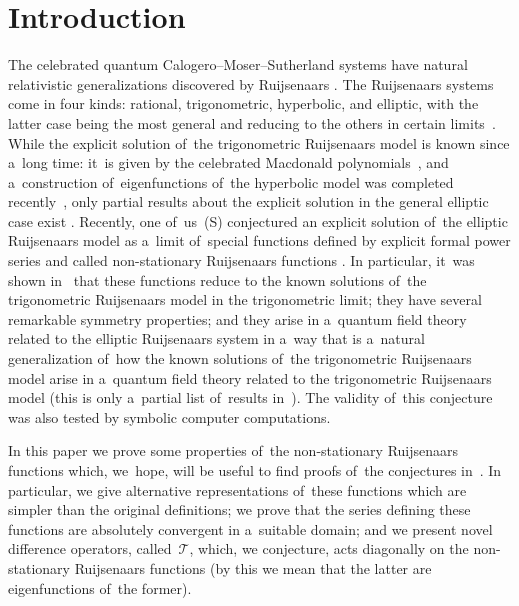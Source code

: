 \documentclass[pdftex]{sigma}%
\numberwithin{equation}{section}
\newcommand{\cT}{{\mathcal T}}
\begin{document}


\renewcommand{\thefootnote}{\arabic{footnote}}
\setcounter{footnote}{0}

\section{Introduction}
The celebrated quantum Calogero--Moser--Sutherland systems \cite{OP83} have natural relativistic gene\-ralizations discovered by Ruijsenaars \cite{R87}. The Ruijsenaars systems come in four kinds: ratio\-nal, trigonometric, hyperbolic, and elliptic, with the latter case being the most general and reducing to the others in certain limits~\cite{R87}. While the explicit solution of~the trigonometric Ruijsenaars model is known since a~long time: it~is given by the celebrated Macdonald polynomials~\cite{MacD}, and a~construction of~eigenfunctions of~the hyperbolic model was completed recently~\cite{HR}, only partial results about the explicit solution in the general elliptic case exist \cite{FV,R09A,R09B}. Recen\-tly, one of~us~(S) conjectured an explicit solution of~the elliptic Ruijsenaars model as a~limit of~special functions defined by explicit formal power series and called non-stationary Ruijsenaars functions \cite{S}. In particular, it~was shown in~\cite{S} that these functions reduce to the known solutions of~the trigonometric Ruijsenaars model in the trigonometric limit; they have several remarkable symmetry properties; and they arise in a~quantum field theory related to the elliptic Ruijsenaars system in a~way that is a~natural generalization of~how the known solutions of~the trigonometric Ruijsenaars model arise in a~quantum field theory related to the trigonometric Ruijsenaars model (this is only a~partial list of~results in~\cite{S}). The validity of~this conjecture was also tested by symbolic computer computations.

In this paper we prove some properties of~the non-stationary Ruijsenaars functions which, we~hope, will be useful to find proofs of~the conjectures in~\cite{S}.
In particular, we give alternative representations of~these functions which are simpler than the original definitions; we prove that the series defining these functions are absolutely convergent in a~suitable domain;
and we present novel difference operators, called~$\cT$, which, we conjecture, acts diagonally on the non-stationary Ruijsenaars functions (by this we mean that the latter are eigenfunctions of~the former).
\end{document}
